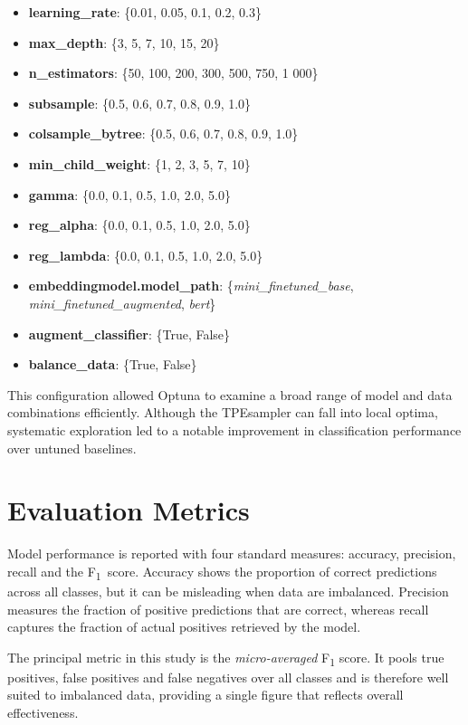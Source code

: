 \documentclass{SGGW-thesis-EN}
\begin{document}
\begin{itemize}
  \item \textbf{learning\_rate}: \{0.01, 0.05, 0.1, 0.2, 0.3\}
  \item \textbf{max\_depth}: \{3, 5, 7, 10, 15, 20\}
  \item \textbf{n\_estimators}: \{50, 100, 200, 300, 500, 750, 1 000\}
  \item \textbf{subsample}: \{0.5, 0.6, 0.7, 0.8, 0.9, 1.0\}
  \item \textbf{colsample\_bytree}: \{0.5, 0.6, 0.7, 0.8, 0.9, 1.0\}
  \item \textbf{min\_child\_weight}: \{1, 2, 3, 5, 7, 10\}
  \item \textbf{gamma}: \{0.0, 0.1, 0.5, 1.0, 2.0, 5.0\}
  \item \textbf{reg\_alpha}: \{0.0, 0.1, 0.5, 1.0, 2.0, 5.0\}
  \item \textbf{reg\_lambda}: \{0.0, 0.1, 0.5, 1.0, 2.0, 5.0\}
  \item \textbf{embeddingmodel.model\_path}:\newline
  \{\textit{mini\_finetuned\_base}, \textit{mini\_finetuned\_augmented}, \textit{bert}\}
  \item \textbf{augment\_classifier}: \{True, False\}
  \item \textbf{balance\_data}: \{True, False\}
\end{itemize}

This configuration allowed Optuna to examine a broad range of model and data combinations efficiently. Although the
TPEsampler can fall into local optima, systematic exploration led to a notable improvement in classification
performance over untuned baselines.


\section{Evaluation Metrics}
Model performance is reported with four standard measures: accuracy, precision, recall and the
F\textsubscript{1}\, score. Accuracy shows the proportion of correct predictions across all classes, but it can be
misleading when data are imbalanced. Precision measures the fraction of positive predictions that are correct, whereas
recall captures the fraction of actual positives retrieved by the model.

The principal metric in this study is the \emph{micro-averaged} F\textsubscript{1} score. It pools true positives,
false positives and false negatives over all classes and is therefore well suited to imbalanced data, providing a
single figure that reflects overall effectiveness.
\end{document}
